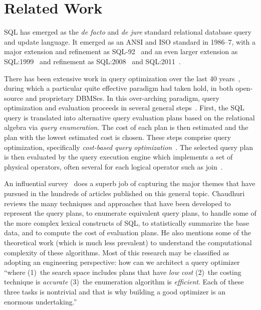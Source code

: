 \documentclass[prodmode,acmtods]{acmsmall}
\begin{document}
\section{Related Work}\label{sec:related}

SQL has emerged as the {\em de facto} and {\em de jure} standard relational
database query and update language. It emerged as an ANSI and ISO standard
in 1986--7, with a major extension and refinement as SQL-92~\cite{Melton93} 
and an even larger extension as SQL:1999~\cite{Melton03} and refinement as
SQL:2008~\cite{SQL2008} and SQL:2011~\cite{Melton11}.  

There has been extensive work in query optimization over the last 40
years~\cite{Ioannidis96,Jarke84}, during which a particular quite effective
paradigm had taken hold, in both open-source and proprietary DBMSes. In this
over-arching paradigm, query optimization and evaluation
proceeds in several general steps~\cite{Ramakrishnan03}. First, the SQL query is 
translated into alternative query evaluation plans based on the 
relational algebra via {\em query enumeration}. The cost
of each plan is then estimated and the plan with the lowest estimated cost
is chosen. These steps comprise query optimization, specifically {\em
cost-based query optimization}~\cite{Selinger}. The selected query plan is
then evaluated by the query execution engine which implements a set of
physical operators, often several for each logical operator such as
join~\cite{Graefe93}.

An influential survey~\cite{Chaudhuri98} does a superb job of
capturing the major themes that have pursued in the hundreds of articles
published on this general topic. Chaudhuri reviews the many techniques and
approaches that have been developed to represent the query plans, to
enumerate equivalent query plans, to handle some of the more complex lexical
constructs of SQL, to statistically summarize the base data, and to compute the
cost of evaluation plans. He also mentions some of the theoretical work
(which is much less prevalent) to understand the computational complexity of
these algorithms. Most of this research may be classified as adopting an
engineering perspective: how can we architect a query optimizer ``where 
(1)~the search space includes plans that have {\em low cost} (2)~the costing
technique is {\em accurate} (3)~the enumeration algorithm is {\em
  efficient}. Each of these three tasks is nontrivial and that is why
building a good optimizer is an enormous undertaking.'' \cite[page~35]{Chaudhuri98}
\end{document}
